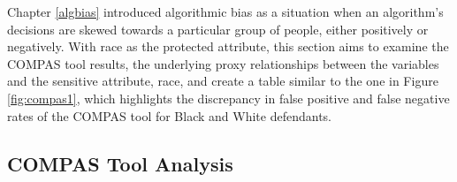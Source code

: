 \documentclass[12pt, twoside]{amherstthesis}
\begin{document}
Chapter \ref{algbias} introduced algorithmic bias as a situation when an algorithm's decisions are skewed towards a particular group of people, either positively or negatively. With race as the protected attribute, this section aims to examine the COMPAS tool results, the underlying proxy relationships between the variables and the sensitive attribute, race, and create a table similar to the one in Figure \ref{fig:compas1}, which highlights the discrepancy in false positive and false negative rates of the COMPAS tool for Black and White defendants.

\hypertarget{comptoolanalysis}{%
\subsection{COMPAS Tool Analysis}\label{comptoolanalysis}}
\end{document}
